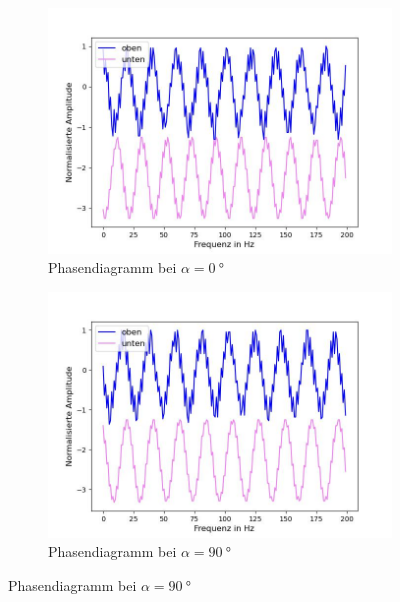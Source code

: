 \documentclass[../main.tex]{subfiles}
\begin{document}
        \begin{figure}[H]
            \centering
            \begin{subfigure}[b]{0.45\textwidth}
                \centering
                \includegraphics[width=\textwidth]{Bilddateien/Auswertung/IV_j_Phasen2306_0Grad.jpg}
                \caption{Phasendiagramm bei $\alpha=\SI{0}{\degree}$}
                \label{fig:IV_j_Phasen2306_0Grad}
            \end{subfigure}
            \hfill
            \begin{subfigure}[b]{0.45\textwidth}
                \centering
                \includegraphics[width=\textwidth]{Bilddateien/Auswertung/IV_j_Phasen2306_90Grad.jpg}
                \caption{Phasendiagramm bei $\alpha=\SI{90}{\degree}$}
                \label{fig:IV_j_Phasen2306_90Grad}

\end{subfigure}
\end{figure}
\end{document}
